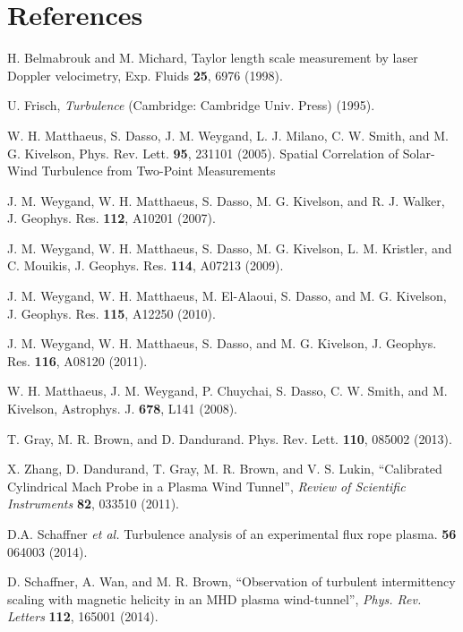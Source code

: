 \documentclass[aip,prl,amsmath,amssymb,reprint,superscriptaddress]{revtex4-1} %
\begin{document}
\section*{References}
\begin{thebibliography}{99}

H. Belmabrouk  and M. Michard, Taylor length scale measurement by laser Doppler velocimetry, Exp. Fluids {\bf 25}, 6976 (1998).

 U. Frisch, {\it Turbulence} (Cambridge: Cambridge Univ. Press) (1995).

W. H. Matthaeus, S. Dasso, J. M. Weygand, L. J. Milano, C. W. Smith, and M. G. Kivelson, Phys. Rev. Lett. {\bf 95}, 231101 (2005). Spatial Correlation of Solar-Wind Turbulence from Two-Point Measurements

J. M. Weygand, W. H. Matthaeus, S. Dasso, M. G. Kivelson, 
and R. J. Walker, J. Geophys. Res. {\bf 112}, A10201 (2007).

J. M. Weygand, W. H. Matthaeus, S. Dasso, M. G. Kivelson, 
L. M. Kristler, and C. Mouikis, J. Geophys. Res. {\bf 114},
A07213 (2009).

J. M. Weygand, W. H. Matthaeus, M. El-Alaoui, S. Dasso, and
M. G. Kivelson, J. Geophys. Res. {\bf 115}, A12250 (2010).

J. M. Weygand, W. H. Matthaeus, S. Dasso, and M. G. Kivelson, J. Geophys. Res. {\bf 116}, A08120 (2011).

W. H. Matthaeus, J. M. Weygand, P. Chuychai, S. Dasso, 
C. W. Smith, and M. Kivelson, Astrophys. J. {\bf 678},
L141 (2008).

 T. Gray, M. R. Brown, and D. Dandurand. Phys. Rev. Lett. {\bf 110}, 085002 (2013). 

X. Zhang, D. Dandurand, T. Gray, M. R. Brown, and V. S. Lukin, ``Calibrated Cylindrical Mach Probe in a Plasma Wind Tunnel'', {\it Review of Scientific Instruments} {\bf 82}, 033510 (2011).

 D.A. Schaffner {\it et al.} Turbulence analysis of an experimental flux rope plasma. {\bf 56} 064003 (2014).

D. Schaffner, A. Wan, and M. R. Brown, ``Observation of turbulent intermittency scaling with magnetic helicity in an MHD plasma wind-tunnel'', {\it Phys. Rev. Letters} {\bf 112}, 165001 (2014).

\end{thebibliography}
\end{document}
